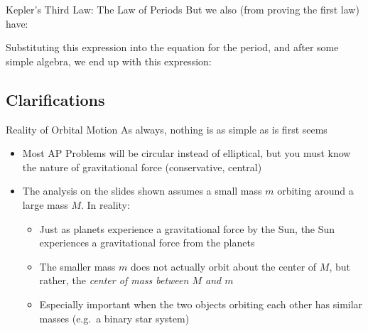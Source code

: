 \documentclass[12pt,compress,aspectratio=169]{beamer}
\begin{document}
\begin{frame}{Kepler's Third Law: The Law of Periods}
  But we also (from proving the first law) have:


  Substituting this expression into the equation for the period, and after
  some simple algebra, we end up with this expression:

\end{frame}





\subsection{Clarifications}

\begin{frame}{Reality of Orbital Motion}
  As always, nothing is as simple as is first seems
  \begin{itemize}
  \item Most AP Problems will be circular instead of elliptical, but you must
    know the nature of gravitational force (conservative, central)
  \item The analysis on the slides shown assumes a small mass $m$ orbiting
    around a large mass $M$. In reality:
    \begin{itemize}
    \item Just as planets experience a gravitational force by the Sun, the Sun
      experiences a gravitational force from the planets
    \item The smaller mass $m$ does not actually orbit about the center of $M$,
      but rather, the \emph{center of mass between $M$ and $m$}
    \item Especially important when the two objects orbiting each other has
      similar masses (e.g.\ a binary star system)
    \end{itemize}
  \end{itemize}
\end{frame}
\end{document}
